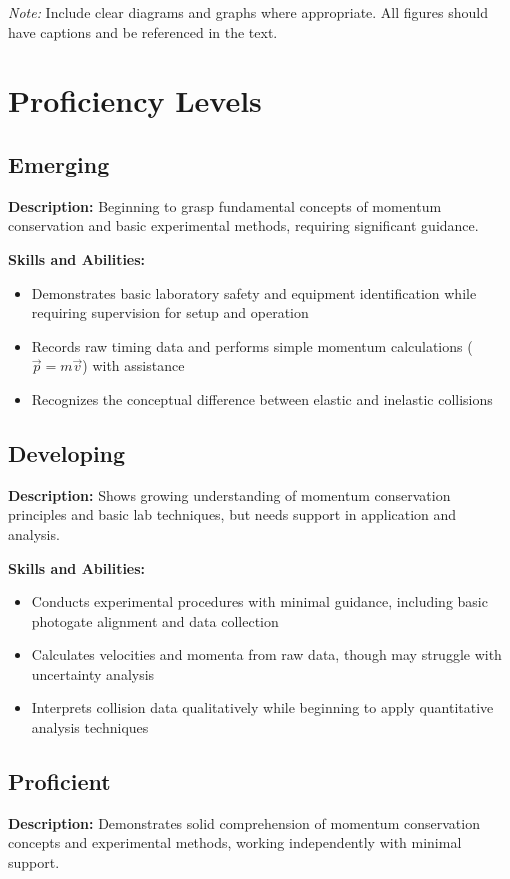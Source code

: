 \documentclass[12pt]{article}
\newcommand{\note}[1]{
    \begin{mdframed}[linecolor=gray!50]
        \textit{Note:} #1
    \end{mdframed}
}
\begin{document}
\note{Include clear diagrams and graphs where appropriate. All figures should have captions and be referenced in the text.}
\newpage
\section*{Proficiency Levels}

\subsection*{Emerging}
\textbf{Description:} Beginning to grasp fundamental concepts of momentum conservation and basic experimental methods, requiring significant guidance.

\noindent\textbf{Skills and Abilities:}
\begin{itemize}[leftmargin=*]
    \item Demonstrates basic laboratory safety and equipment identification while requiring supervision for setup and operation
    \item Records raw timing data and performs simple momentum calculations ($\vec{p} = m\vec{v}$) with assistance
    \item Recognizes the conceptual difference between elastic and inelastic collisions
\end{itemize}

\subsection*{Developing}
\textbf{Description:} Shows growing understanding of momentum conservation principles and basic lab techniques, but needs support in application and analysis.

\noindent\textbf{Skills and Abilities:}
\begin{itemize}[leftmargin=*]
    \item Conducts experimental procedures with minimal guidance, including basic photogate alignment and data collection
    \item Calculates velocities and momenta from raw data, though may struggle with uncertainty analysis
    \item Interprets collision data qualitatively while beginning to apply quantitative analysis techniques
\end{itemize}

\subsection*{Proficient}
\textbf{Description:} Demonstrates solid comprehension of momentum conservation concepts and experimental methods, working independently with minimal support.
\end{document}
